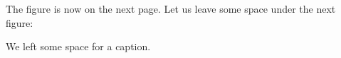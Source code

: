 \documentclass{article}
\begin{document}
{\centering{}\par}

The figure is now on the next page.  Let us leave some space under the
next figure:

{\centering{}\par}
We left some space for a caption.
\end{document}
